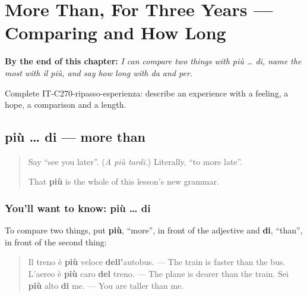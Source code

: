 
\chapter{More Than, For Three Years --- Comparing and How Long}
\label{ch:it-comparing-and-how-long}

\begin{chapteropening}
\textbf{By the end of this chapter:} \emph{I can compare two things with più … di, name the most with il più, and say how long with da and per.}

Complete IT-C270-ripasso-esperienza: describe an experience with a feeling, a hope, a comparison and a length.
\end{chapteropening}

\section[più … di]{più … di — more than}

\label{lesson:IT-C270-piu-di}



\begin{quote}
Say \textquotedblleft{}see you later\textquotedblright{}. (\emph{A più tardi.}) Literally, \textquotedblleft{}to more late\textquotedblright{}.

That \textbf{più} is the whole of this lesson's new grammar.
\end{quote}

\subsection*{You'll want to know: più … di}
To compare two things, put \textbf{più}, \textquotedblleft{}more\textquotedblright{}, in front of the adjective and \textbf{di}, \textquotedblleft{}than\textquotedblright{}, in front of the second thing:

\begin{quote}
Il treno è \textbf{più} veloce \textbf{dell'}autobus. — The train is faster than the bus. L'aereo è \textbf{più} caro \textbf{del} treno. — The plane is dearer than the train. Sei \textbf{più} alto \textbf{di} me. — You are taller than me.
\end{quote}

